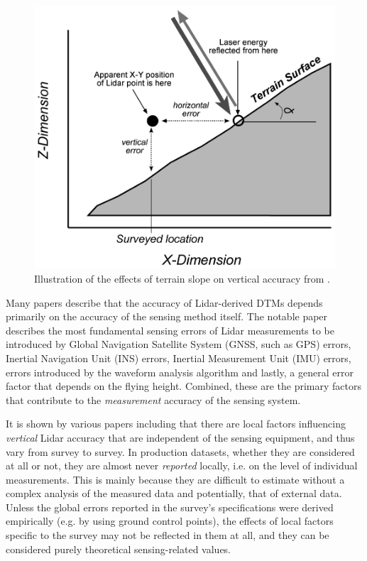 \begin{figure}
    \includegraphics[width=0.95\linewidth]{final_report/figs/hodgson_breshanan_2004_01.png} 
    \caption{Illustration of the effects of terrain slope on vertical accuracy from \cite{hodgson_breshanan_2004}.}
    \label{fig:elevationaccuracy}
\end{figure}

Many papers describe that the accuracy of Lidar-derived DTMs depends primarily on the accuracy of the sensing method itself. The notable paper \cite{hodgson_breshanan_2004} describes the most fundamental sensing errors of Lidar measurements to be introduced by Global Navigation Satellite System (GNSS, such as GPS) errors, Inertial Navigation Unit (INS) errors, Inertial Measurement Unit (IMU) errors, errors introduced by the waveform analysis algorithm and lastly, a general error factor that depends on the flying height. Combined, these are the primary factors that contribute to the \textit{measurement} accuracy of the sensing system.

It is shown by various papers including \cite{hodgson_breshanan_2004, su_bork_2006, kraus_etal_2006, raber_etal_2007, peng_shih_2006, chow_hodgson_2009, aguilar_etal_2005, aguilar_etal_2010, guo_etal_2010} that there are local factors influencing \textit{vertical} Lidar accuracy that are independent of the sensing equipment, and thus vary from survey to survey. In production datasets, whether they are considered at all or not, they are almost never \textit{reported} locally, i.e. on the level of individual measurements. This is mainly because they are difficult to estimate without a complex analysis of the measured data and potentially, that of external data. Unless the global errors reported in the survey's specifications were derived empirically (e.g. by using ground control points), the effects of local factors specific to the survey may not be reflected in them at all, and they can be considered purely theoretical sensing-related values.

